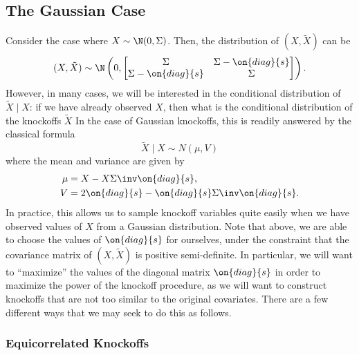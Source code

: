 \documentclass[11pt,reqno]{report}
\theoremstyle{definition}
\numberwithin{equation}{section}
\begin{document}
\subsection{The Gaussian Case}
Consider the case where $X \sim \N(0, \Sigma)$. Then, the distribution of $(X, \tilde{X})$ can be
\[ (X, \tilde{X}) \sim \N \left(0, \begin{bmatrix}
	\Sigma & \Sigma - \on{diag}\{s \} \\
	\Sigma - \on{diag}\{s \} & \Sigma
\end{bmatrix} \right). \] However, in many cases, we will be interested in the conditional distribution of $\tilde{X} \mid X$: if we have already observed $X$, then what is the conditional distribution of the knockoffs $\tilde{X}$ In the case of Gaussian knockoffs, this is readily answered by the classical formula
\[ \tilde{X} \mid X \sim N(\mu, V) \] where the mean and variance are given by
\begin{align*}
\mu &= X - X \Sigma\inv \on{diag}\{ s \}, \\
V &= 2 \on{diag}\{ s \} - \on{diag}\{ s \} \Sigma\inv \on{diag} \{ s \}.
\end{align*}
In practice, this allows us to sample knockoff variables quite easily when we have observed values of $X$ from a Gaussian distribution. Note that above, we are able to choose the values of $\on{diag}\{s\}$ for ourselves, under the constraint that the covariance matrix of $(X, \tilde{X})$ is positive semi-definite. In particular, we will want to ``maximize'' the values of the diagonal matrix $\on{diag}\{s\}$ in order to maximize the power of the knockoff procedure, as we will want to construct knockoffs that are not too similar to the original covariates. There are a few different ways that we may seek to do this as follows.
\subsubsection{Equicorrelated Knockoffs}

\subsubsection{}
\end{document}
